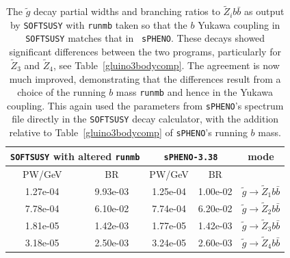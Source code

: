 \documentclass[final,3p,times]{elsarticle}
\def\code#1{{\tt #1}}
\begin{document}
\begin{center}
\begin{table}
\centering
\begin{tabular}{|c|c|c|c|c|} \hline
\multicolumn{2}{|C{3.0cm}|}{{\tt SOFTSUSY} with altered {\tt runmb}} & \multicolumn{2}{C{3.0cm}|}{{\tt sPHENO-3.38}} & mode \\ \hline
PW/GeV & BR & PW/GeV & BR & \\ \hline
1.27e-04 & 9.93e-03 & 1.25e-04 & 1.00e-02 & $\tilde{g} \rightarrow \tilde{Z}_1 b \bar{b}$ \\ \hline
7.78e-04 & 6.10e-02 & 7.74e-04 & 6.20e-02 & $\tilde{g} \rightarrow \tilde{Z}_2 b \bar{b}$ \\ \hline
1.81e-05 & 1.42e-03 & 1.77e-05 & 1.42e-03 & $\tilde{g} \rightarrow \tilde{Z}_3 b \bar{b}$ \\ \hline
3.18e-05 & 2.50e-03 & 3.24e-05 & 2.60e-03 & $\tilde{g} \rightarrow \tilde{Z}_4 b \bar{b}$ \\  \hline
\end{tabular}
\caption{The $\tilde{g}$ decay partial widths and branching ratios to
  $\tilde{Z}_i b \bar{b}$ as output by {\tt SOFTSUSY} with \code{runmb} taken
  so that the $b$ Yukawa coupling in {\tt SOFTSUSY} matches that in {\tt
    sPHENO}. These decays showed significant differences between the two
  programs, particularly for $\tilde{Z}_3$ and $\tilde{Z}_4$, see
  Table~\ref{gluino3bodycomp}. The agreement is now much improved,
  demonstrating that the differences result from a choice of the running $b$
  mass \code{runmb} and hence in the Yukawa coupling. This again used the
  parameters from {\tt sPHENO}'s spectrum file directly in the {\tt SOFTSUSY}
  decay calculator, with the addition relative to Table~\ref{gluino3bodycomp}
  of {\tt sPHENO}'s running $b$ mass.} 
\label{glutoneutbbnewyuk}
\end{table}
\end{center}
\end{document}
